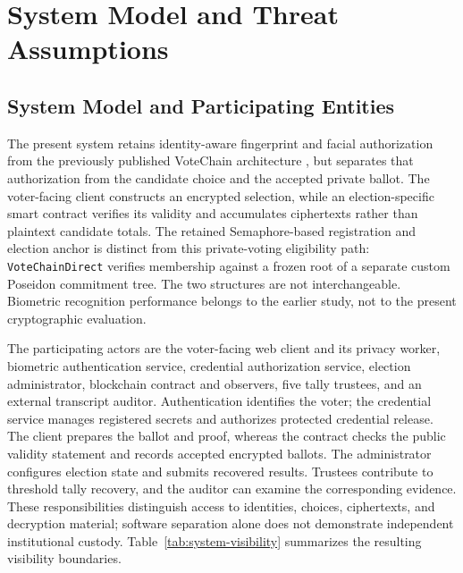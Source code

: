 \section{System Model and Threat Assumptions}
\label{sec:03}
\label{sec:system-model}

\subsection{System Model and Participating Entities}
\label{subsec:system-entities}

The present system retains identity-aware fingerprint and facial authorization from
the previously published VoteChain architecture \citep{rifat2026biometric}, but
separates that authorization from the candidate choice and the accepted private
ballot. The voter-facing client constructs an encrypted selection, while an
election-specific smart contract verifies its validity and accumulates ciphertexts
rather than plaintext candidate totals. The retained Semaphore-based registration
and election anchor is distinct from this private-voting eligibility path:
\texttt{VoteChainDirect} verifies membership against a frozen root of a separate
custom Poseidon commitment tree. The two structures are not interchangeable.
Biometric recognition performance belongs to the earlier study, not to the present
cryptographic evaluation.

The participating actors are the voter-facing web client and its privacy worker,
biometric authentication service, credential authorization service, election
administrator, blockchain contract and observers, five tally trustees, and an
external transcript auditor. Authentication identifies the voter; the credential
service manages registered secrets and authorizes protected credential release. The
client prepares the ballot and proof, whereas the contract checks the public
validity statement and records accepted encrypted ballots. The administrator
configures election state and submits recovered results. Trustees contribute to
threshold tally recovery, and the auditor can examine the corresponding evidence.
These responsibilities distinguish access to identities, choices, ciphertexts, and
decryption material; software separation alone does not demonstrate independent
institutional custody. Table~\ref{tab:system-visibility} summarizes the resulting
visibility boundaries.

